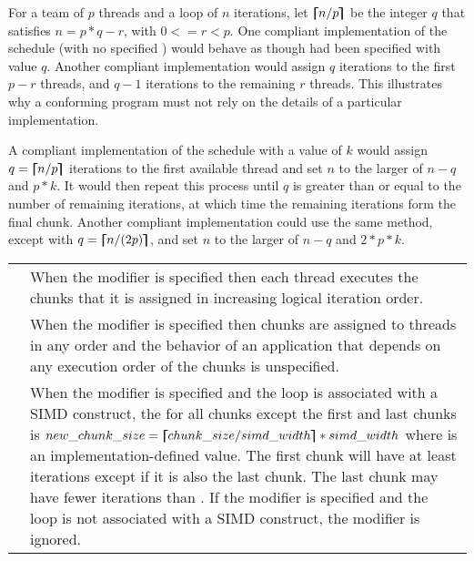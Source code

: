 \begin{note}
For a team of $p$ threads and a loop of $n$ iterations, let $\bm{\lceil\mkern-10mu\lceil} n/p \bm{\rceil\mkern-10mu\rceil}$ be the integer $q$
that satisfies $n = p*q - r$, with $0 <= r < p$. One compliant implementation of the 
schedule (with no specified ) would behave as though  had been
specified with value $q$. Another compliant implementation would assign $q$ iterations to
the first $p-r$ threads, and $q-1$ iterations to the remaining $r$ threads. This illustrates why a
conforming program must not rely on the details of a particular implementation.

A compliant implementation of the  schedule with a  value of $k$
would assign $q = \bm{\lceil\mkern-10mu\lceil} n/p \bm{\rceil\mkern-10mu\rceil}$ iterations to the first available thread and set $n$ to the larger of
$n-q$ and $p*k$. It would then repeat this process until $q$ is greater than or equal to the
number of remaining iterations, at which time the remaining iterations form the final
chunk. Another compliant implementation could use the same method, except with
$q = \bm{\lceil\mkern-10mu\lceil} n/(2p) \bm{\rceil\mkern-10mu\rceil}$, and set $n$ to the larger of $n-q$ and $2*p*k$.
\end{note}


\nolinenumbers

\tablefirsthead{%
\hline\\[-3ex]
}
\tablelasttail{\hline}
\begin{supertabular}{ p{1in} p{4.1in} }
{} & When the {} modifier is specified then each thread executes the chunks
that it is assigned in increasing logical iteration order.\\
{} & When the {} modifier is specified then chunks are assigned to threads
in any order and the behavior of an application that depends on any execution order of the chunks is unspecified.\\
{} & When the {} modifier is specified and the loop is associated with a SIMD construct, the {} for all chunks except the first and last chunks  is  $new\_chunk\_size = \bm{\lceil\mkern-10mu\lceil} chunk\_size / simd\_width \bm{\rceil\mkern-10mu\rceil} * simd\_width $ where {} is an implementation-defined value. The first chunk will have at least {} iterations except if it is also the last chunk. The last chunk may have fewer iterations than {}. If the {} modifier is specified and the loop is not associated  with a SIMD construct, the modifier is ignored.\\
\end{supertabular}
\linenumbers
\medskip

